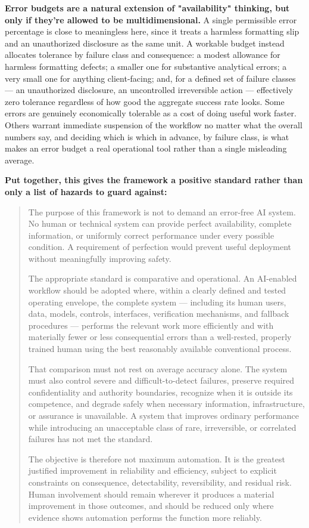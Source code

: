 \textbf{Error budgets are a natural extension of "availability" thinking, but only if they're allowed to be multidimensional.} A single permissible error percentage is close to meaningless here, since it treats a harmless formatting slip and an unauthorized disclosure as the same unit. A workable budget instead allocates tolerance by failure class and consequence: a modest allowance for harmless formatting defects; a smaller one for substantive analytical errors; a very small one for anything client-facing; and, for a defined set of failure classes --- an unauthorized disclosure, an uncontrolled irreversible action --- effectively zero tolerance regardless of how good the aggregate success rate looks. Some errors are genuinely economically tolerable as a cost of doing useful work faster. Others warrant immediate suspension of the workflow no matter what the overall numbers say, and deciding which is which in advance, by failure class, is what makes an error budget a real operational tool rather than a single misleading average.

\textbf{Put together, this gives the framework a positive standard rather than only a list of hazards to guard against:}

\begin{quote}
The purpose of this framework is not to demand an error-free AI system. No human or technical system can provide perfect availability, complete information, or uniformly correct performance under every possible condition. A requirement of perfection would prevent useful deployment without meaningfully improving safety.

The appropriate standard is comparative and operational. An AI-enabled workflow should be adopted where, within a clearly defined and tested operating envelope, the complete system --- including its human users, data, models, controls, interfaces, verification mechanisms, and fallback procedures --- performs the relevant work more efficiently and with materially fewer or less consequential errors than a well-rested, properly trained human using the best reasonably available conventional process.

That comparison must not rest on average accuracy alone. The system must also control severe and difficult-to-detect failures, preserve required confidentiality and authority boundaries, recognize when it is outside its competence, and degrade safely when necessary information, infrastructure, or assurance is unavailable. A system that improves ordinary performance while introducing an unacceptable class of rare, irreversible, or correlated failures has not met the standard.

The objective is therefore not maximum automation. It is the greatest justified improvement in reliability and efficiency, subject to explicit constraints on consequence, detectability, reversibility, and residual risk. Human involvement should remain wherever it produces a material improvement in those outcomes, and should be reduced only where evidence shows automation performs the function more reliably.

\end{quote}


